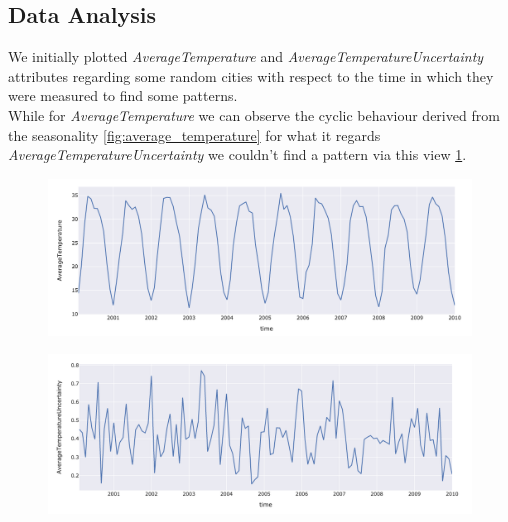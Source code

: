 \subsection{Data Analysis}
We initially plotted \textit{AverageTemperature} and \textit{AverageTemperatureUncertainty} attributes regarding some random cities with respect to the time in which they were measured to find some patterns.\\
While for \textit{AverageTemperature} we can observe the cyclic behaviour derived from the seasonality \ref{fig:average_temperature} for what it regards \textit{AverageTemperatureUncertainty} we couldn't find a pattern via this view \ref{fig:average_temperature_uncertainty}.
\begin{figure}[h]
	\centering
	\begin{minipage}{.48\textwidth}
    	\centering
    	\includegraphics[width=\textwidth]{plots/timeseries/Average Temperature.png}
    	\label{fig:average_temperature}
	\end{minipage}%
    \begin{minipage}{.48\textwidth}
    	\centering
    	\includegraphics[width=\textwidth]{plots/timeseries/Average Temperature Uncertainty.png}
    	\label{fig:average_temperature_uncertainty}
    \end{minipage}
\end{figure}\\
